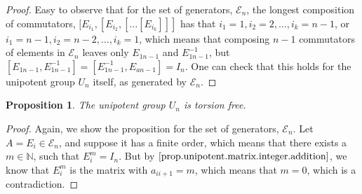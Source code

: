 \documentclass[12pt]{article}
\newtheorem{proposition}[theorem]{Proposition}
\begin{document}
\begin{proof}
Easy to observe that for the set of generators, $\mathcal{E}_n$, the longest composition of commutators, $[E_{i_1},[E_{i_2},[\dots[E_{i_k}]]]$ has that $i_1=1,i_2=2,\dots,i_k=n-1$, or $i_1=n-1,i_2=n-2,\dots,i_k=1$, which means that composing $n-1$ commutators of elements in $\mathcal{E}_n$ leaves only $E_{1n-1}$ and $E_{1n-1}^{-1}$, but $[E_{1n-1},E_{1n-1}^{-1}]=[E_{1n-1}^{-1},E_{an-1}]=I_n$. One can check that this holds for the unipotent group $U_n$ itself, as generated by $\mathcal{E}_n$.
\end{proof}
\begin{proposition}
\label{prop.unipotent.group.torsion.free}
The unipotent group $U_n$ is torsion free.
\end{proposition}
\begin{proof}
Again, we show the proposition for the set of generators, $\mathcal{E}_n$. Let $A=E_i\in\mathcal{E}_n$, and suppose it has a finite order, which means that there exists a $m\in\mathbb{N}$, such that $E_i^m=I_n$. But by $\ref{prop.unipotent.matrix.integer.addition}$, we know that $E_i^m$ is the matrix with $a_{ii+1}=m$, which means that $m=0$, which is a contradiction.
\end{proof}
\end{document}
